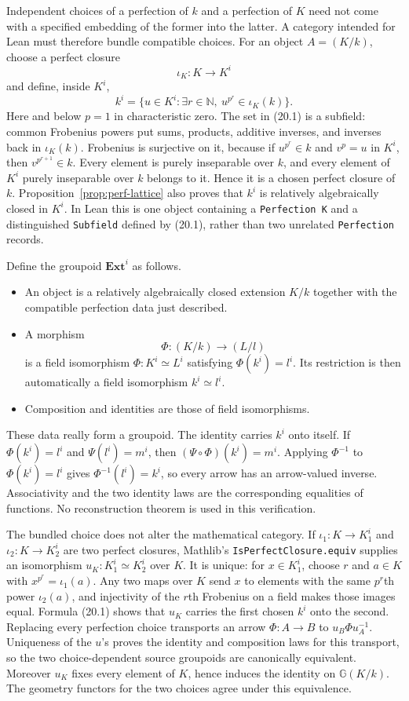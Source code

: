 \documentclass[11pt,oneside]{article}
\theoremstyle{definition}
\theoremstyle{remark}
\newcommand{\lean}[1]{\nolinkurl{#1}}
\begin{document}
Independent choices of a perfection of $k$ and a perfection of $K$ need not come with a
specified embedding of the former into the latter.  A category intended for Lean must
therefore bundle compatible choices.  For an object $A=(K/k)$, choose a perfect closure
\[
  \iota_K:K\longrightarrow K^i
\]
and define, inside $K^i$,
\[
  k^i=\{u\in K^i:\exists r\in\mathbb N,\
                    u^{p^r}\in\iota_K(k)\}.                    \tag{20.1}
\]
Here and below $p=1$ in characteristic zero.  The set in (20.1) is a subfield: common
Frobenius powers put sums, products, additive inverses, and inverses back in
$\iota_K(k)$.  Frobenius is surjective on it, because if $u^{p^r}\in k$ and $v^p=u$ in
$K^i$, then $v^{p^{r+1}}\in k$.  Every element is purely inseparable over $k$, and every
element of $K^i$ purely inseparable over $k$ belongs to it.  Hence it is a chosen perfect
closure of $k$.  Proposition~\ref{prop:perf-lattice} also proves that $k^i$ is relatively
algebraically closed in $K^i$.  In Lean this is one object containing a
\lean{Perfection K} and a distinguished \lean{Subfield} defined by (20.1), rather than two
unrelated \lean{Perfection} records.

Define the groupoid $\mathbf{Ext}^{i}$ as follows.
\begin{itemize}[leftmargin=9mm]
\item An object is a relatively algebraically closed extension $K/k$ together with the
compatible perfection data just described.
\item A morphism
\[
  \Phi:(K/k)\longrightarrow(L/l)
\]
is a field isomorphism $\Phi:K^i\simeq L^i$ satisfying
$\Phi(k^i)=l^i$.  Its restriction is then automatically a field isomorphism
$k^i\simeq l^i$.
\item Composition and identities are those of field isomorphisms.
\end{itemize}
These data really form a groupoid.  The identity carries $k^i$ onto itself.  If
$\Phi(k^i)=l^i$ and $\Psi(l^i)=m^i$, then
$(\Psi\circ\Phi)(k^i)=m^i$.  Applying $\Phi^{-1}$ to
$\Phi(k^i)=l^i$ gives $\Phi^{-1}(l^i)=k^i$, so every arrow has an arrow-valued inverse.
Associativity and the two identity laws are the corresponding equalities of functions.
No reconstruction theorem is used in this verification.

The bundled choice does not alter the mathematical category.  If
$\iota_1:K\to K^i_1$ and $\iota_2:K\to K^i_2$ are two perfect closures, Mathlib's
\lean{IsPerfectClosure.equiv} supplies an isomorphism $u_K:K^i_1\simeq K^i_2$ over $K$.
It is unique: for $x\in K^i_1$, choose $r$ and $a\in K$ with
$x^{p^r}=\iota_1(a)$.  Any two maps over $K$ send $x$ to elements with the same
$p^r$th power $\iota_2(a)$, and injectivity of the $r$th Frobenius on a field makes those
images equal.  Formula (20.1) shows that $u_K$ carries the first chosen $k^i$ onto the
second.  Replacing every perfection choice transports an arrow $\Phi:A\to B$ to
$u_B\Phi u_A^{-1}$.  Uniqueness of the $u$'s proves the identity and composition laws for
this transport, so the two choice-dependent source groupoids are canonically equivalent.
Moreover $u_K$ fixes every element of $K$, hence induces the identity on
$\mathbb G(K/k)$.  The geometry functors for the two choices agree under this equivalence.
\end{document}
